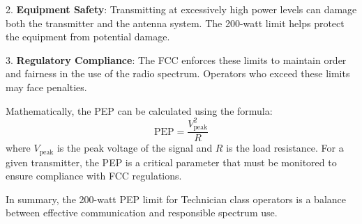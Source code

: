 2. \textbf{Equipment Safety}: Transmitting at excessively high power levels can damage both the transmitter and the antenna system. The 200-watt limit helps protect the equipment from potential damage.

3. \textbf{Regulatory Compliance}: The FCC enforces these limits to maintain order and fairness in the use of the radio spectrum. Operators who exceed these limits may face penalties.

Mathematically, the PEP can be calculated using the formula:
\[
\text{PEP} = \frac{V_{\text{peak}}^2}{R}
\]
where \( V_{\text{peak}} \) is the peak voltage of the signal and \( R \) is the load resistance. For a given transmitter, the PEP is a critical parameter that must be monitored to ensure compliance with FCC regulations.

In summary, the 200-watt PEP limit for Technician class operators is a balance between effective communication and responsible spectrum use.

